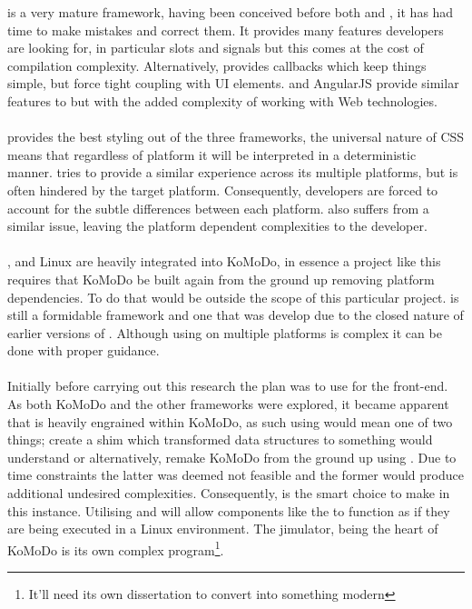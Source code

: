  is a very mature framework, having been conceived before both  and , it has had time to make mistakes and correct them. It provides many features developers are looking for, in particular slots and signals but this comes at the cost of compilation complexity. Alternatively,  provides callbacks which keep things simple, but force tight coupling with UI elements.  and AngularJS provide similar features to  but with the added complexity of working with Web technologies.\\\\
%
 provides the best styling out of the three frameworks, the universal nature of CSS means that regardless of platform it will be interpreted in a deterministic manner.  tries to provide a similar experience across its multiple platforms, but is often hindered by the target platform. Consequently, developers are forced to account for the subtle differences between each platform.  also suffers from a similar issue, leaving the platform dependent complexities to the developer.\\\\
%
,  and Linux are heavily integrated into KoMoDo, in essence a project like this requires that KoMoDo be built again from the ground up removing platform dependencies. To do that would be outside the scope of this particular project.  is still a formidable framework and one that was develop due to the closed nature of earlier versions of . Although using  on multiple platforms is complex it can be done with proper guidance.\\\\
%
Initially before carrying out this research the plan was to use  for the front-end. As both KoMoDo and the other frameworks were explored, it became apparent that  is heavily engrained within KoMoDo, as such using  would mean one of two things; create a shim which transformed  data structures to something  would understand or alternatively, remake KoMoDo from the ground up using . Due to time constraints the latter was deemed not feasible and the former would produce additional undesired complexities. Consequently,  is the smart choice to make in this instance. Utilising  and  will allow components like the  to function as if they are being executed in a Linux environment. The jimulator, being the heart of KoMoDo is its own complex program\footnote{It'll need its own dissertation to convert into something modern}.

